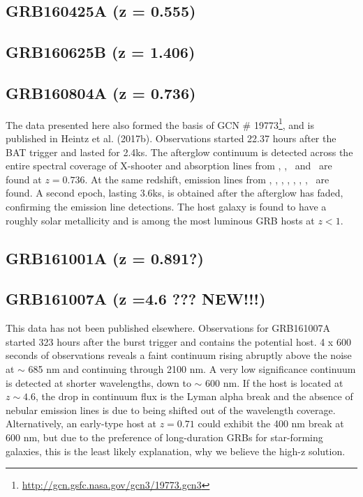 \documentclass{aa}    %
\begin{document}
\subsection{GRB160425A (z = 0.555)}	



\subsection{GRB160625B (z = 1.406)}	



\subsection{GRB160804A (z = 0.736)}
The data presented here also formed the basis of GCN \#
19773\footnote{\url{http://gcn.gsfc.nasa.gov/gcn3/19773.gcn3}}, and is
published in Heintz et al. (2017b). Observations started 22.37 hours after the
BAT trigger and lasted for 2.4ks. The afterglow continuum is detected across the entire
spectral coverage of X-shooter and absorption lines from \mgi, \mgii, \feii~and
\alii~are found at $z = 0.736$. At the same redshift, emission lines from \oii,
\oiii, \ha, \hb, \hg, \nii, \sii, \siii~are found. A second epoch, lasting
3.6ks, is obtained after the afterglow has faded, confirming the emission line
detections. The host galaxy is found to have a roughly solar metallicity and is
among the most luminous GRB hosts at $z < 1$.


\subsection{GRB161001A (z = 0.891?)}	



\subsection{GRB161007A (z =4.6 ??? NEW!!!)}
This data has not been published elsewhere. Observations for GRB161007A started
323 hours after the burst trigger and contains the potential host. 4 x 600 seconds
of observations reveals a faint continuum rising abruptly above the noise at
$\sim$ 685 nm and continuing through 2100 nm. A very low significance
continuum is detected at shorter wavelengths, down to $\sim$ 600 nm. If the
host is located at $z \sim 4.6$, the drop in continuum flux is the Lyman alpha
break and the absence of nebular emission lines is due to \oii being shifted
out of the wavelength coverage. Alternatively, an early-type host at $z = 0.71$
could exhibit the 400 nm break at 600 nm, but due to the preference of
long-duration GRBs for star-forming galaxies, this is the least likely
explanation, why we believe the high-z solution.
\end{document}
